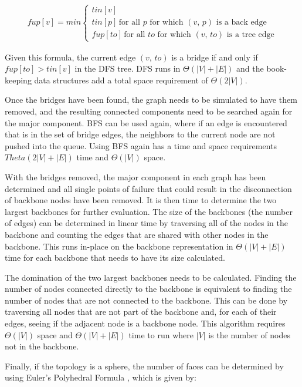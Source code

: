 \documentclass{article}
\begin{document}
        \begin{align}
            fup[v] = min
            \begin{cases}
                tin[v] \\
                tin[p]\,\text{for all $p$ for which $(v,\,p)$ is a back edge} \\
                fup[to]\,\text{for all $to$ for which $(v,\,to)$ is a tree edge}
            \end{cases}
        \end{align}

        Given this formula, the current edge $(v,\,to)$ is a bridge if and only if $fup[to] > tin[v]$ in the DFS tree. DFS runs in $\Theta(|V| + |E|)$ and the book-keeping data structures add a total space requirement of $\Theta(2|V|)$.
        \par
        Once the bridges have been found, the graph needs to be simulated to have them removed, and the resulting connected components need to be searched again for the major component. BFS can be used again, where if an edge is encountered that is in the set of bridge edges, the neighbors to the current node are not pushed into the queue. Using BFS again has a time and space requirements $Theta(2|V| + |E|)$ time and $\Theta(|V|)$ space.
        \par
        With the bridges removed, the major component in each graph has been determined and all single points of failure that could result in the disconnection of backbone nodes have been removed. It is then time to determine the two largest backbones for further evaluation. The size of the backbones (the number of edges) can be determined in linear time by traversing all of the nodes in the backbone and counting the edges that are shared with other nodes in the backbone. This runs in-place on the backbone representation in $\Theta(|V| + |E|)$ time for each backbone that needs to have its size calculated.
        \par
        The domination of the two largest backbones needs to be calculated. Finding the number of nodes connected directly to the backbone is equivalent to finding the number of nodes that are not connected to the backbone. This can be done by traversing all nodes that are not part of the backbone and, for each of their edges, seeing if the adjacent node is a backbone node. This algorithm requires $\Theta(|V|)$ space and $\Theta(|V| + |E|)$ time to run where $|V|$ is the number of nodes not in the backbone.
        \par
        Finally, if the topology is a sphere, the number of faces can be determined by using Euler's Polyhedral Formula \cite{euler}, which is given by:
\end{document}
